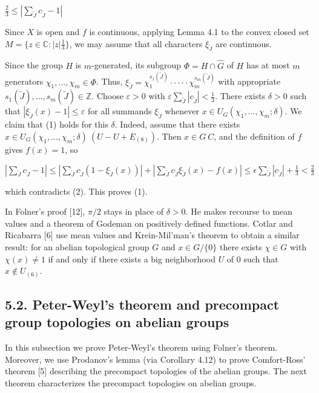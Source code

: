 \documentclass[12pt]{article}
\begin{document}
    $\frac{2}{3} \leqslant |\sum_{\tilde{J}} c_{\tilde{J}} - 1|$


    Since $X$ is open and $f$ is continuous, applying Lemma 4.1 to the convex closed set $M = \{z \in \mathbb{C}: |z|  \frac{1}{3}\}$, we may assume
that all characters $\xi_{\tilde{J}}$ are continuous.


Since the group $H$ is $m$-generated, its subgroup $\Phi = H \cap \hat{G}$ of $H$ has at most $m$ generators $\chi_1,...,\chi_m \in \Phi$. Thus,
$\xi_{\tilde{J}} = \chi^{s_1(\tilde{J})}_1 · ··· · \chi^{s_m(\tilde{J})}_m$ with appropriate $s_1(\tilde{J}), . . . , s_m(\tilde{J}) \in \mathbb{Z}$. Choose $\varepsilon > 0$ with $\varepsilon \sum_\tilde{J} |c_\tilde{J}| < \frac{1}{3}$. There exists $\delta > 0$ such that
$|\xi_{\tilde{J}}(x) - 1| \leqslant \varepsilon$ for all summands $\xi_{\tilde{J}}$ whenever $x \in U_G (\chi_1,...,\chi_m; \delta)$. We claim that (1) holds for this $\delta$. Indeed, assume that
there exists $x \in U_G (\chi_1,...,\chi_m; \delta) \ (U - U + E_{(8)})$. Then $x \in G \ C$, and the definition of $f$ gives $f(x) = 1$, so


$|\sum_{\tilde{J}} c_{\tilde{J}} - 1| \leqslant |\sum_{\tilde{J}} c_{\tilde{J}}(1 - \xi_{\tilde{J}}(x))| + |\sum_{\tilde{J}} c_{\tilde{J}} \xi_{\tilde{J}}(x) - f(x)| \leqslant \epsilon \sum_{\tilde{J}} |c_{\tilde{J}}| + \frac{1}{3} < \frac{2}{3}$


which contradicts (2). This proves (1). 


    In Folner's proof [12], $\pi /2$ stays in place of $\delta > 0$. He makes recourse to mean values and a theorem of Godeman on
positively defined functions. Cotlar and Ricabarra [6] use mean values and Krein-Mil'man's theorem to obtain a similar
result: for an abelian topological group $G$ and $x \in G / \{0\}$ there exists $\chi \in G$ with $\chi(x) \neq 1$ if and only if there exists a big
neighborhood $U$ of 0 such that $x \notin  U_{(6)}$.


\subsection{5.2. Peter-Weyl's theorem and precompact group topologies on abelian groups}


    In this subsection we prove Peter-Weyl's theorem using Folner's theorem. Moreover, we use Prodanov's lemma (via
Corollary 4.12) to prove Comfort-Ross' theorem [5] describing the precompact topologies of the abelian groups.
The next theorem characterizes the precompact topologies on abelian groups.
\end{document}
